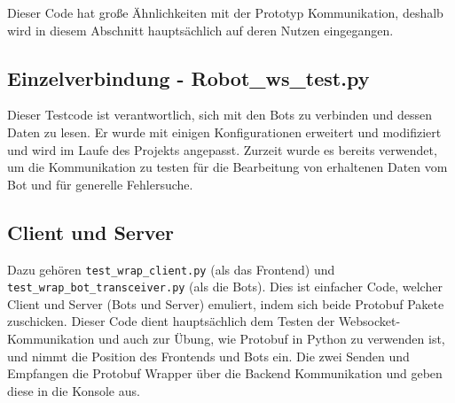 Dieser Code hat große Ähnlichkeiten mit der Prototyp Kommunikation, 
deshalb wird in diesem Abschnitt hauptsächlich auf deren Nutzen eingegangen.

\subsection{Einzelverbindung - Robot\_ws\_test.py}
Dieser Testcode ist verantwortlich, sich mit den Bots zu verbinden 
und dessen Daten zu lesen.
Er wurde mit einigen Konfigurationen erweitert und modifiziert 
und wird im Laufe des Projekts angepasst.
Zurzeit wurde es bereits verwendet, 
um die Kommunikation zu testen 
für die Bearbeitung von erhaltenen Daten vom Bot 
und für generelle Fehlersuche.

\subsection{Client und Server}
Dazu gehören \texttt{test\_wrap\_client.py} (als das Frontend) 
und \texttt{test\_wrap\_bot\_transceiver.py} (als die Bots).
Dies ist einfacher Code, welcher Client und Server (Bots und Server) emuliert, 
indem sich beide Protobuf Pakete zuschicken. 
Dieser Code dient hauptsächlich dem Testen der Websocket-Kommunikation 
und auch zur Übung, wie Protobuf in Python zu verwenden ist, 
und nimmt die Position des Frontends und Bots ein.
Die zwei Senden und Empfangen die Protobuf Wrapper über die Backend Kommunikation 
und geben diese in die Konsole aus.
